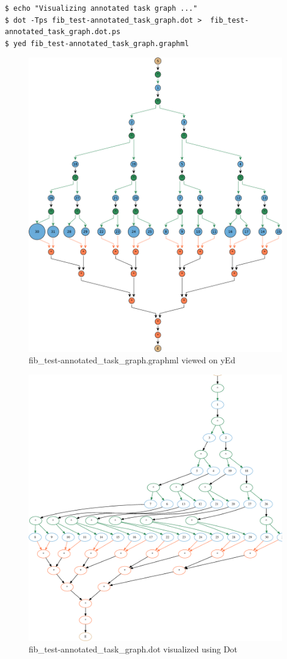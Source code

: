 \documentclass[11pt,a4paper,notitlepage]{article}
\begin{document}
\begin{lstlisting}[style=BashInputStyle]
$ echo "Visualizing annotated task graph ..."
$ dot -Tps fib_test-annotated_task_graph.dot >  fib_test-annotated_task_graph.dot.ps
$ yed fib_test-annotated_task_graph.graphml
\end{lstlisting}

\begin{figure}[!ht]
\centering
\includegraphics[width=\textwidth]{figures/fib_test-10_4-annotated_task_graph-yed.pdf}
\caption{fib\_test-annotated\_task\_graph.graphml viewed on yEd}
\label{fig:yed-atg}
\end{figure}

\begin{figure}[!ht]
\centering
\includegraphics[width=\textwidth]{figures/fib_test-10_4-annotated_task_graph-dot.eps}
\caption{fib\_test-annotated\_task\_graph.dot visualized using Dot}
\label{fig:dot-atg}
\end{figure}
\end{document}
